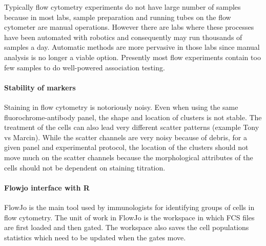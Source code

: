 Typically flow cytometry experiments do not have large number of samples because in most labs, sample preparation and running tubes on the flow
cytometer are manual operations.
However there are labs where these processes have been automated with robotics
and consequently may run thousands of samples a day.
Automatic methods are more pervasive in those labs since manual analysis is no longer a viable option.
Presently most flow experiments contain too few samples to do well-powered association testing.


\paragraph{ Stability of markers }

Staining in flow cytometry is notoriously noisy.
Even when using the same fluorochrome-antibody panel, the shape and location of clusters is not stable.
The treatment of the cells can also lead very different scatter patterns (example Tony vs Marcin).
While the scatter channels are very noisy because of debris, for a given panel and experimental protocol,
the location of the clusters should not move much on the scatter channels because the morphological attributes of the cells should not be dependent on staining titration.


\paragraph{ Flowjo interface with R}

FlowJo is the main tool used by immunologists for identifying groups of cells in flow cytometry.
The unit of work in FlowJo is the workspace in which FCS files are first loaded and then gated.
The workspace also saves the cell populations statistics which need to be updated when the gates move.

